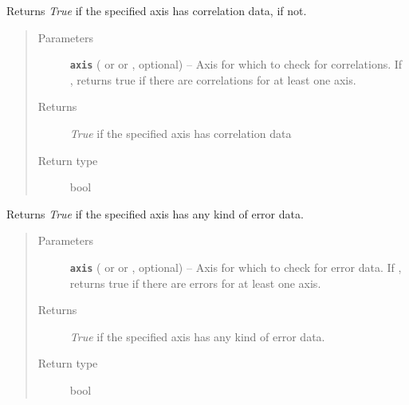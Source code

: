 \documentclass[a4paper,10pt,english]{sphinxmanual}
\begin{document}
\begin{fulllineitems}

\begin{fulllineitems}
\label{module_doc:kafe.dataset.Dataset.has_correlations}
Returns \emph{True} if the specified axis has correlation data,  if
not.
\begin{quote}\begin{description}
\item[{Parameters}] \leavevmode
\textbf{\texttt{axis}} ( or  or , optional) -- Axis for which to check for correlations. If ,
returns true if there are correlations for at least one axis.

\item[{Returns}] \leavevmode
\emph{True} if the specified axis has correlation data

\item[{Return type}] \leavevmode
bool

\end{description}\end{quote}

\end{fulllineitems}


\begin{fulllineitems}
\label{module_doc:kafe.dataset.Dataset.has_errors}
Returns \emph{True} if the specified axis has any kind of error data.
\begin{quote}\begin{description}
\item[{Parameters}] \leavevmode
\textbf{\texttt{axis}} ( or  or , optional) -- Axis for which to check for error data. If ,
returns true if there are errors for at least one axis.

\item[{Returns}] \leavevmode
\emph{True} if the specified axis has any kind of error data.

\item[{Return type}] \leavevmode
bool

\end{description}\end{quote}

\end{fulllineitems}


\end{fulllineitems}
\end{document}

